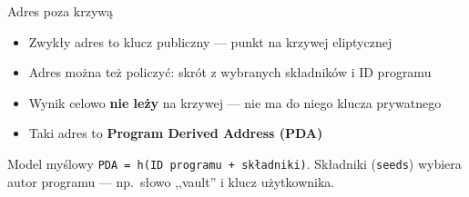\begin{frame}{Adres poza krzywą}
  \begin{itemize}
    \item Zwykły adres to klucz publiczny --- punkt na krzywej eliptycznej
    \item Adres można też policzyć: skrót z wybranych składników i ID programu
    \item Wynik celowo \textbf{nie leży} na krzywej --- nie ma do niego klucza prywatnego
    \item Taki adres to \textbf{Program Derived Address (PDA)}
  \end{itemize}
  \vspace{0.25cm}
  \begin{block}{Model myślowy}
    \texttt{PDA = h(ID programu + składniki)}. Składniki (\texttt{seeds}) wybiera
    autor programu --- np.\ słowo ,,vault'' i klucz użytkownika.
  \end{block}
\end{frame}


